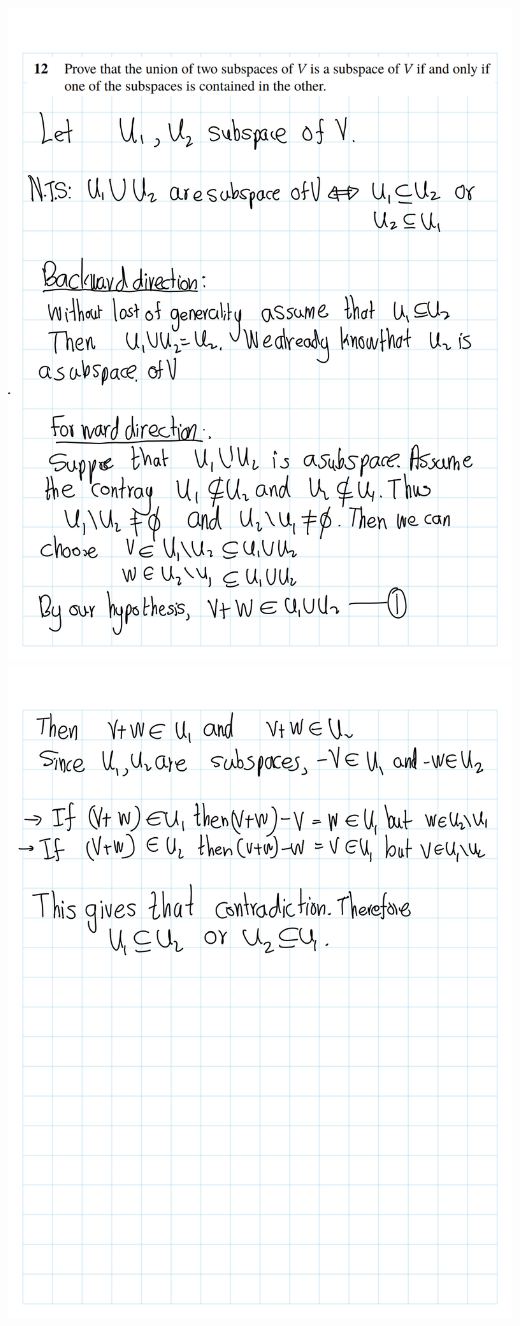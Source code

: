 \documentclass[
]{book}
\theoremstyle{definition}
\theoremstyle{definition}
\theoremstyle{definition}
\theoremstyle{definition}
\theoremstyle{remark}
\begin{document}
\begin{enumerate}
  \includegraphics{fig/Ex1C/Ex/Ex-12.png} \includegraphics{fig/Ex1C/Ex/Ex-13.png}

\end{enumerate}
\end{document}

